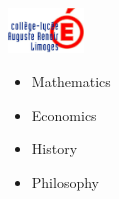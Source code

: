 \noindent
\begin{minipage}{.15\textwidth}
\centerline{\includegraphics[width=20mm]{img/renoir}}
\end{minipage}%
\hspace{5mm}
\begin{minipage}{.7\textwidth}
\raggedright
    \begin{itemize}
        \item Mathematics
        \item Economics
        \item History
        \item Philosophy
    \end{itemize}
\end{minipage}